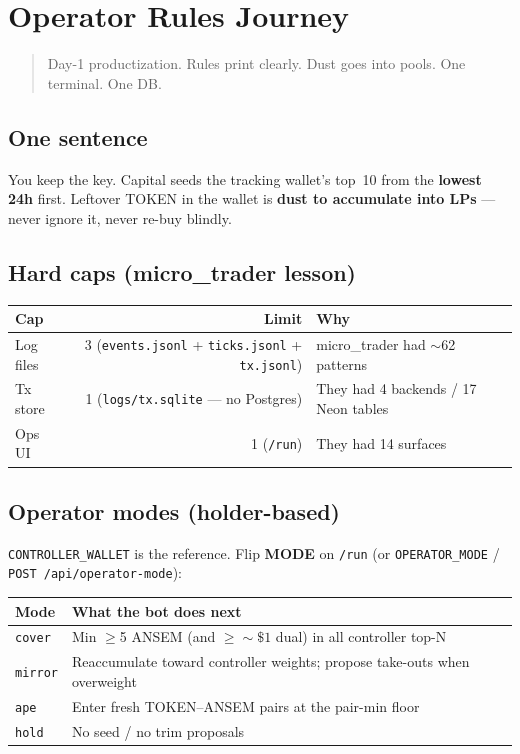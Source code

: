 \chapter{Operator Rules Journey}

\begin{quote}
Day-1 productization. Rules print clearly. Dust goes into pools. One terminal. One DB.
\end{quote}

\section{One sentence}

You keep the key. Capital seeds the tracking wallet's top~10 from the \textbf{lowest 24h} first.
Leftover TOKEN in the wallet is \textbf{dust to accumulate into LPs} --- never ignore it, never re-buy blindly.

\section{Hard caps (micro\_trader lesson)}

\begin{tabular}{lrl}
\textbf{Cap} & \textbf{Limit} & \textbf{Why} \\
\hline
Log files & 3 (\texttt{events.jsonl} + \texttt{ticks.jsonl} + \texttt{tx.jsonl}) & micro\_trader had $\sim$62 patterns \\
Tx store & 1 (\texttt{logs/tx.sqlite} --- no Postgres) & They had 4 backends / 17 Neon tables \\
Ops UI & 1 (\texttt{/run}) & They had 14 surfaces \\
\end{tabular}

\section{Operator modes (holder-based)}

\texttt{CONTROLLER\_WALLET} is the reference. Flip \textbf{MODE} on \texttt{/run}
(or \texttt{OPERATOR\_MODE} / \texttt{POST /api/operator-mode}):

\begin{tabular}{ll}
\textbf{Mode} & \textbf{What the bot does next} \\
\hline
\texttt{cover} & Min $\geq$5 ANSEM (and $\geq\sim\$1$ dual) in all controller top-N \\
\texttt{mirror} & Reaccumulate toward controller weights; propose take-outs when overweight \\
\texttt{ape} & Enter fresh TOKEN--ANSEM pairs at the pair-min floor \\
\texttt{hold} & No seed / no trim proposals \\
\end{tabular}

